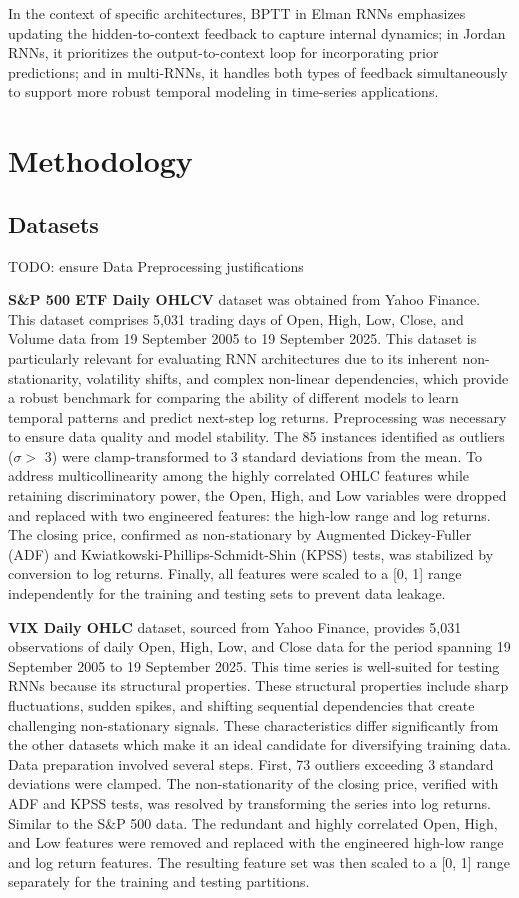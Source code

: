 \documentclass[conference, 10pt]{IEEEtran}
\begin{document}
In the context of specific architectures, BPTT in Elman RNNs emphasizes updating the hidden-to-context feedback to
capture internal dynamics; in Jordan RNNs, it prioritizes the output-to-context loop for incorporating prior
predictions; and in multi-RNNs, it handles both types of feedback simultaneously to support more robust temporal
modeling in time-series applications.

\section{Methodology}
\subsection{Datasets}
TODO: ensure Data Preprocessing justifications

\textbf{S\&P 500 ETF Daily OHLCV} dataset was obtained from Yahoo Finance. This dataset comprises 5,031 trading days of
Open, High, Low, Close, and Volume data from 19 September 2005 to 19 September 2025. This dataset is particularly
relevant for evaluating RNN architectures due to its inherent non-stationarity, volatility shifts, and complex
non-linear dependencies, which provide a robust benchmark for comparing the ability of different models to learn
temporal patterns and predict next-step log returns. Preprocessing was necessary to ensure data quality and model
stability. The 85 instances identified as outliers ($\sigma >$ 3) were clamp-transformed to 3 standard deviations from
the mean. To address multicollinearity among the highly correlated OHLC features while retaining discriminatory power,
the Open, High, and Low variables were dropped and replaced with two engineered features: the high-low range and log
returns. The closing price, confirmed as non-stationary by Augmented Dickey-Fuller (ADF) and
Kwiatkowski-Phillips-Schmidt-Shin (KPSS) tests, was stabilized by conversion to log returns. Finally, all features were
scaled to a [0, 1] range independently for the training and testing sets to prevent data leakage.

\textbf{VIX Daily OHLC} dataset, sourced from Yahoo Finance, provides 5,031 observations of daily Open, High, Low, and
Close data for the period spanning 19 September 2005 to 19 September 2025. This time series is well-suited for testing
RNNs because its structural properties. These structural properties include sharp fluctuations, sudden spikes, and
shifting sequential dependencies that create challenging non-stationary signals. These characteristics differ
significantly from the other datasets which make it an ideal candidate for diversifying training data. Data preparation
involved several steps. First, 73 outliers exceeding 3 standard deviations were clamped. The non-stationarity of the
closing price, verified with ADF and KPSS tests, was resolved by transforming the series into log returns. Similar to
the S\&P 500 data. The redundant and highly correlated Open, High, and Low features were removed and replaced with the
engineered high-low range and log return features. The resulting feature set was then scaled to a [0, 1] range
separately for the training and testing partitions.
\end{document}

